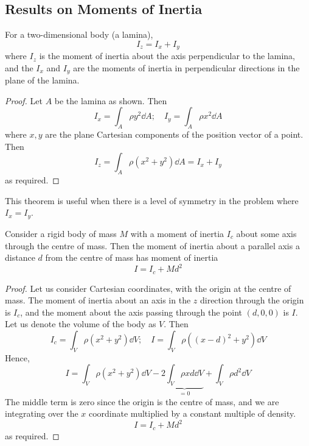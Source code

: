 \subsection{Results on Moments of Inertia}
\begin{theorem}
	For a two-dimensional body (a lamina),
	\[
		I_z = I_x + I_y
	\]
	where \(I_z\) is the moment of inertia about the axis perpendicular to the lamina, and the \(I_x\) and \(I_y\) are the moments of inertia in perpendicular directions in the plane of the lamina.
\end{theorem}
\begin{proof}
	Let \(A\) be the lamina as shown.
	Then
	\[
		I_x = \int_A \rho y^2 \dd{A};\quad I_y = \int_A \rho x^2 \dd{A}
	\]
	where \(x, y\) are the plane Cartesian components of the position vector of a point.
	Then
	\[
		I_z = \int_A \rho (x^2 + y^2) \dd{A} = I_x + I_y
	\]
	as required.
\end{proof}
\noindent This theorem is useful when there is a level of symmetry in the problem where \(I_x = I_y\).
\begin{theorem}
	Consider a rigid body of mass \(M\) with a moment of inertia \(I_c\) about some axis through the centre of mass.
	Then the moment of inertia about a parallel axis a distance \(d\) from the centre of mass has moment of inertia
	\[
		I = I_c + Md^2
	\]
\end{theorem}
\begin{proof}
	Let us consider Cartesian coordinates, with the origin at the centre of mass.
	The moment of inertia about an axis in the \(z\) direction through the origin is \(I_c\), and the moment about the axis passing through the point \((d, 0, 0)\) is \(I\).
	Let us denote the volume of the body as \(V\).
	Then
	\[
		I_c = \int_V \rho (x^2 + y^2) \dd{V};\quad I = \int_V \rho ((x-d)^2 + y^2) \dd{V}
	\]
	Hence,
	\[
		I = \int_V \rho (x^2 + y^2) \dd{V} - 2\underbrace{\int_V \rho xd \dd{V}}_{=0} + \int_V \rho d^2 \dd{V}
	\]
	The middle term is zero since the origin is the centre of mass, and we are integrating over the \(x\) coordinate multiplied by a constant multiple of density.
	\[
		I = I_c + Md^2
	\]
	as required.
\end{proof}


